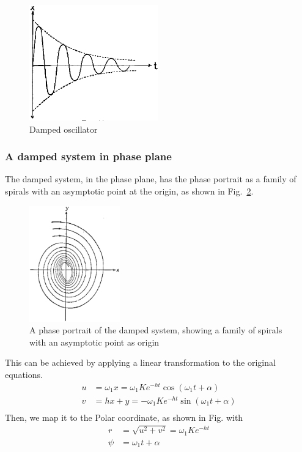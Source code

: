 \begin{figure}[hbt]
  \centerline{\includegraphics[height=5cm]{./images/damped_oscillator.eps}}
  \caption{Damped oscillator}
  \label{fig:damped_osc}
\end{figure}

\subsubsection{A damped system in phase plane}
\label{sec:damped-system-phase}

The damped system, in the phase plane, has the phase portrait as a
family of spirals with an asymptotic point at the origin, as shown in
Fig.~\ref{fig:spiral_damped}.

\begin{figure}[hbt]
  \centerline{\includegraphics[height=5cm]{./images/spiral_damped_system.eps}}
  \caption{A phase portrait of the damped system, showing a family of
    spirals with an asymptotic point as origin}
  \label{fig:spiral_damped}
\end{figure}

This can be achieved by applying a linear transformation to the
original equations.
\begin{equation}
  \label{eq:378}
  \begin{split}
    u &= \omega_1x=\omega_1Ke^{-ht}\cos(\omega_1t+\alpha) \\
    v &= hx+y =  -\omega_1Ke^{-ht}\sin(\omega_1t+\alpha) \\
  \end{split}  
\end{equation}
Then, we map it to the Polar coordinate, as shown in Fig. with
\begin{equation}
  \label{eq:379}
  \begin{split}
    r&=\sqrt{u^2+v^2}=\omega_1Ke^{-ht}\\
    \psi&=\omega_1t+\alpha
  \end{split}
\end{equation}

